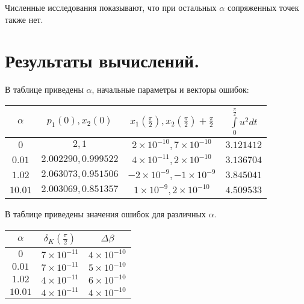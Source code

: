 \documentclass{article}
\begin{document}
Численные исследования показывают, что при остальных $\alpha$
сопряженных точек также нет.
\section{Результаты вычислений.}
В таблице приведены $\alpha$, начальные параметры и векторы ошибок:

\begin{tabular}{|c|c|c|c|}
  \hline
  $\alpha$ & $p_{1}(0), x_{2}(0)$ & $x_{1}(\frac \pi 2), x_{2}(\frac
  \pi 2) + \frac \pi 2$ & $\int\limits_{0}^{\frac \pi 2}u^{2}dt$\\
  \hline
  $0$ & $2, 1$ & $2\times10^{-10}, 7\times10^{-10}$ & $3.121412$\\
  $0.01$ &$2.002290, 0.999522$ &$4\times 10^{-11}, 2\times 10^{-10}$
  & $3.136704$\\
  $1.02$ &$2.063073, 0.951506$ &$-2\times 10^{-9}, -1\times 10^{-9}$
  & $3.845041$\\
  $10.01$ &$2.003069, 0.851357$ &$1\times 10^{-9}, 2\times 10^{-10}$
  & $4.509533$\\
  \hline
\end{tabular}

В таблице приведены значения ошибок для различных $\alpha$.

\begin{tabular}{|c|c|c|}
  \hline
  $\alpha$ & $\delta_{K}(\frac \pi 2)$ & $\Delta \beta$\\
  \hline
  $0$ & $7\times 10^{-11}$ & $4\times 10^{-10}$\\
  $0.01$ & $7\times 10^{-11}$ & $5\times 10^{-10}$\\
  $1.02$ & $4\times 10^{-11}$ & $6\times 10^{-10}$\\
  $10.01$ & $4\times 10^{-11}$ & $4\times 10^{-10}$\\
  \hline
\end{tabular}
\end{document}

